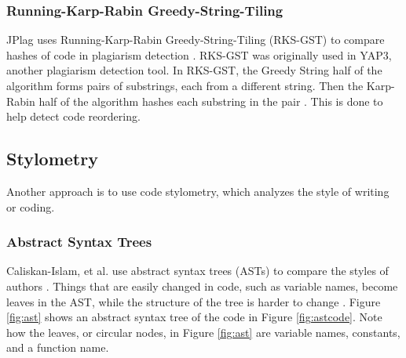 \documentclass[10pt,journal,compsoc]{IEEEtran}
\begin{document}
			\subsubsection{Running-Karp-Rabin Greedy-String-Tiling}
			JPlag uses Running-Karp-Rabin Greedy-String-Tiling (RKS-GST) to compare hashes of code in plagiarism detection \cite{prechelt+malpohl+philippsen}. RKS-GST was originally used in YAP3, another plagiarism detection tool. In RKS-GST, the Greedy String half of the algorithm forms pairs of substrings, each from a different string. Then the Karp-Rabin half of the algorithm hashes each substring in the pair \cite{wise}. This is done to help detect code reordering.
		
		\subsection{Stylometry}
		Another approach is to use code stylometry, which analyzes the style of writing or coding.
		
			\subsubsection{Abstract Syntax Trees}
			Caliskan-Islam, et al. use abstract syntax trees (ASTs) to compare the styles of authors \cite{caliskan-islam+harang+liu}. Things that are easily changed in code, such as variable names, become leaves in the AST, while the structure of the tree is harder to change \cite{caliskan-islam+harang+liu}. Figure \ref{fig:ast} shows an abstract syntax tree of the code in Figure \ref{fig:astcode}. Note how the leaves, or circular nodes, in Figure \ref{fig:ast} are variable names, constants, and a function name.
		
\end{document}
